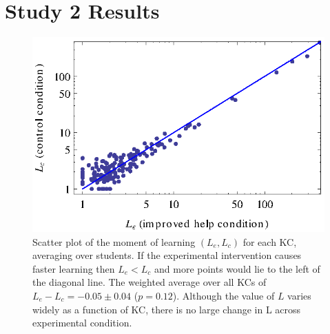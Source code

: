 \documentclass{edm_template}
\begin{document}
\section{Study 2 Results}
%
%

\begin{figure}
   \centering\includegraphics{scatter-step.eps}
   \caption{Scatter plot of the moment of learning $(L_e,L_c)$ for each
     KC, averaging over students.  If the experimental intervention causes
     faster learning then $L_e<L_c$ and more points would lie to the 
     left of the diagonal line.
     The weighted average over all KCs of $L_e-L_c = -0.05\pm 0.04$ ($p=0.12$).
     Although the value of $L$ varies widely as a function of KC, there
     is no large change in L across experimental condition.
   }\label{scatterstep}
\end{figure}
\end{document}
